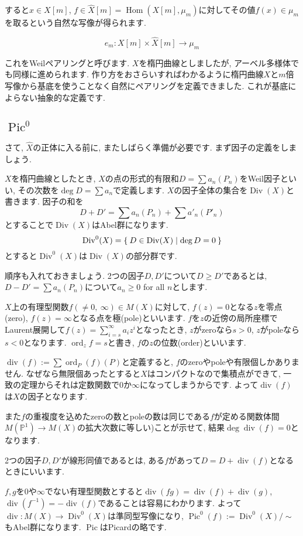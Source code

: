 \documentclass{jsarticle}
\newcommand{\PP}{\mathbb{P}}
\newcommand{\makeop}[1]{\mathop{\mathrm{#1}}\nolimits}
\def\Hom{\makeop{Hom}}
\def\Pic{\makeop{Pic}}
\def\Div{\makeop{Div}}
\def\div{\makeop{div}}
\def\ord{\makeop{ord}}
\theoremstyle{definition}
\numberwithin{theorem}{section}
\begin{document}
すると$x \in X[m]$, $f \in \hat{X}[m] = \Hom(X[m], \mu_m)$に対してその値$f(x) \in \mu_m$を取るという自然な写像が得られます. 

\begin{equation*}
e_m: X[m] \times \hat{X}[m] \rightarrow \mu_m
\end{equation*}

これをWeilペアリングと呼びます. $X$を楕円曲線としましたが, アーベル多様体でも同様に進められます. 作り方をおさらいすればわかるように楕円曲線$X$と$m$倍写像から基底を使うことなく自然にペアリングを定義できました. これが基底によらない抽象的な定義です. 

\subsection{$\Pic^0$}
さて, $\hat{X}$の正体に入る前に, またしばらく準備が必要です. まず因子の定義をしましょう.

$X$を楕円曲線としたとき, $X$の点の形式的有限和$D = \sum a_n(P_n)$をWeil因子といい, その次数を$\deg D = \sum a_n$で定義します. $X$の因子全体の集合を$\Div(X)$と書きます.
因子の和を
\[
D + D' = \sum a_n(P_n) + \sum a'_n (P'_n)
\]
とすることで$\Div(X)$はAbel群になります.
\[
\Div^0(X) = \Set{D \in \Div(X) | \deg D = 0}
\]
とすると$\Div^0(X)$は$\Div(X)$の部分群です. 

順序も入れておきましょう. 2つの因子$D, D'$について$D \geq D'$であるとは, $D - D' = \sum a_n(P_n)$について$a_n \geq 0$ for all $n$とします.

$X$上の有理型関数$f(\neq 0,\ \infty) \in M(X)$に対して, $f(z) = 0$となる$z$を零点(zero), $f(z) = \infty$となる点を極(pole)といいます. $f$を$z$の近傍の局所座標でLaurent展開して$f(z) = \sum_{i=s}^\infty a_iz^i$となったとき, $z$がzeroなら$s > 0$, $z$がpoleなら$s < 0$となります. $\ord_z f = s$と書き, $f$の$z$の位数(order)といいます. 

$\div(f) := \sum \ord_P(f) (P)$と定義すると, $f$のzeroやpoleや有限個しかありません. なぜなら無限個あったとすると$X$はコンパクトなので集積点ができて, 一致の定理からそれは定数関数で0か$\infty$になってしまうからです. よって$\div(f)$は$X$の因子となります. 

また$f$の重複度を込めたzeroの数とpoleの数は同じである$f$が定める関数体間$M(\PP^1) \rightarrow M(X)$の拡大次数に等しい)ことが示せて, 結果$\deg \div(f) = 0$となります. 

2つの因子$D, D'$が線形同値であるとは, ある$f$があって$D = D + \div(f)$となるときにいいます.

$f, g$を0や$\infty$でない有理型関数とすると$\div(fg) = \div(f) + \div(g)$, $\div(f^{-1}) = -\div(f)$であることは容易にわかります. よって $\div: M(X) \rightarrow \Div^0(X)$は準同型写像になり, $\Pic^0(f) := \Div^0(X)/\sim$もAbel群になります. $\Pic$はPicardの略です. 
\end{document}

